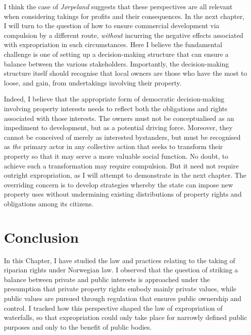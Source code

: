 {{I think the case of \emph{Jørpeland} suggests that these perspectives are all relevant when considering takings for profits and their consequences. In the next chapter, I will turn to the question of how to ensure commercial development via compulsion by a different route, {\it without} incurring the negative effects associated with expropriation in such circumstances. Here I believe the fundamental challenge is one of setting up a decision-making structure that can ensure a balance between the various stakeholders. Importantly, the decision-making structure itself should recognise that local owners are those who have the most to loose, and gain, from undertakings involving their property. 

Indeed, I believe that the appropriate form of democratic decision-making involving property interests needs to reflect both the obligations and rights associated with those interests. The owners must not be conceptualised as an impediment to development, but as a potential driving force. Moreover, they cannot be conceived of merely as interested bystanders, but must be recognised as {\it the} primary actor in any collective action that seeks to transform their property so that it may serve a more valuable social function. No doubt, to achieve such a transformation may require compulsion. But it need not require outright expropriation, as I will attempt to demonstrate in the next chapter. The overriding concern is to develop strategies whereby the state can impose new property uses without undermining existing distributions of property rights and obligations among its citizens.
} }
 
\section{Conclusion}\label{conc}

In this Chapter, I have studied the law and practices relating to the taking of riparian rights under Norwegian law. I observed that the question of striking a balance between private and public interests is approached under the presumption that private property rights embody mainly private values, while public values are pursued through regulation that ensures public ownership and control. I tracked how this perspective shaped the law of expropriation of waterfalls, so that expropriation could only take place for narrowly defined public purposes and only to the benefit of public bodies.

